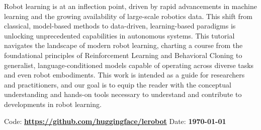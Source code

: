 Robot learning is at an inflection point, driven by rapid advancements in machine learning and the growing availability of large-scale robotics data. 
This shift from classical, model-based methods to data-driven, learning-based paradigms is unlocking unprecedented capabilities in autonomous systems. 
This tutorial navigates the landscape of modern robot learning, charting a course from the foundational principles of Reinforcement Learning and Behavioral Cloning to generalist, language-conditioned models capable of operating across diverse tasks and even robot embodiments.
This work is intended as a guide for researchers and practitioners, and our goal is to equip the reader with the conceptual understanding and hands-on tools necessary to understand and contribute to developments in robot learning.
\newline

Code: \textbf{\url{https://github.com/huggingface/lerobot}}
\newline
Date: \textbf{\today}